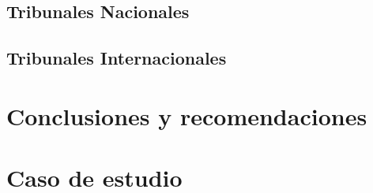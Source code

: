 \documentclass[
]{book}
\begin{document}
\hypertarget{tribunales-nacionales}{%
\section{Tribunales Nacionales}\label{tribunales-nacionales}}

\hypertarget{tribunales-internacionales}{%
\section{Tribunales Internacionales}\label{tribunales-internacionales}}

\hypertarget{conclusiones-y-recomendaciones}{%
\chapter{Conclusiones y recomendaciones}\label{conclusiones-y-recomendaciones}}

\hypertarget{caso-de-estudio}{%
\chapter*{Caso de estudio}\label{caso-de-estudio}}

  
\end{document}
